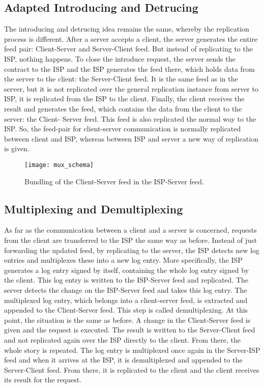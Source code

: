 \subsection{Adapted Introducing and Detrucing}
The introducing and detrucing idea remains the same, whereby the replication process is
different. After a server accepts a client, the server generates the entire feed pair: Client-Server and Server-Client feed. But instead of replicating to the ISP, nothing happens. To close the introduce request, the server sends the contract to the ISP and the ISP generates the feed there, which holds data from the server to the client: the Server-Client feed. It is the same feed as in the server, but it is not replicated over the general replication instance from server to ISP, it is replicated from the ISP to the client. Finally, the client receives the result and generates the feed, which contains the data from the client to the server: the Client- Server feed. This feed is also replicated the normal way to the ISP. So, the feed-pair for client-server communication is normally replicated between client and ISP, whereas between ISP and server a new way of replication is given.

\begin{figure}
    \centering
    \texttt{[image: mux\_schema]}
    \caption{Bundling of the Client-Server feed in the ISP-Server feed.}
    \label{fig:mux}
\end{figure}

\subsection{Multiplexing and Demultiplexing}
As far as the communication between a client and a server is concerned, requests from the client are transferred to the ISP the same way as before. Instead of just forwarding the updated feed, by replicating to the server, the ISP detects new log entries and multiplexes these into a new log entry.
More specifically, the ISP generates a log entry signed by itself, containing the whole log entry signed by the client. This log entry is written to the ISP-Server feed and replicated. The server detects the change on the ISP-Server feed and takes this log entry. The multiplexed log entry, which belongs into a client-server feed, is extracted and appended to the Client-Server feed. This step is called demultiplexing. At this point, the situation is the same as before. A change in the Client-Server feed is given and the request is executed. The result is written to the Server-Client feed and not replicated again over the ISP directly to the client. From there, the whole story is repeated. The log entry is multiplexed once again in the Server-ISP feed and when it arrives at the ISP, it is demultiplexed and appended to the Server-Client feed. From there, it is replicated to the client and the client receives its result for the request.


